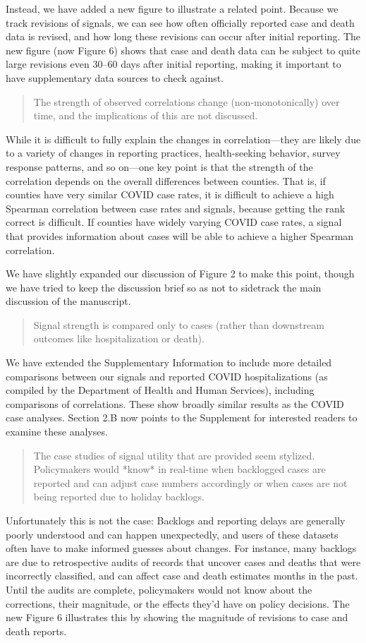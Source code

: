 \documentclass[11pt]{article}
\begin{document}
Instead, we have added a new figure to illustrate a related point. Because we
track revisions of signals, we can see how often officially reported case and
death data is revised, and how long these revisions can occur after initial
reporting. The new figure (now Figure 6) shows that case and death data can be
subject to quite large revisions even 30--60 days after initial reporting,
making it important to have supplementary data sources to check against.

\begin{quote}
  The strength of observed correlations change (non-monotonically) over time,
  and the implications of this are not discussed.
\end{quote}
While it is difficult to fully explain the changes in correlation---they are
likely due to a variety of changes in reporting practices, health-seeking
behavior, survey response patterns, and so on---one key point is that the
strength of the correlation depends on the overall differences between counties.
That is, if counties have very similar COVID case rates, it is difficult to
achieve a high Spearman correlation between case rates and signals, because
getting the rank correct is difficult. If counties have widely varying COVID
case rates, a signal that provides information about cases will be able to
achieve a higher Spearman correlation.

We have slightly expanded our discussion of Figure 2 to make this point, though
we have tried to keep the discussion brief so as not to sidetrack the main
discussion of the manuscript.

\begin{quote}
  Signal strength is compared only to cases (rather than downstream outcomes
  like hospitalization or death).
\end{quote}
We have extended the Supplementary Information to include more detailed
comparisons between our signals and reported COVID hospitalizations (as compiled
by the Department of Health and Human Services), including comparisons of
correlations. These show broadly similar results as the COVID case analyses.
Section 2.B now points to the Supplement for interested readers to examine these
analyses.

\begin{quote}
  The case studies of signal utility that are provided seem stylized.
  Policymakers would *know* in real-time when backlogged cases are reported and
  can adjust case numbers accordingly or when cases are not being reported due
  to holiday backlogs.
\end{quote}
Unfortunately this is not the case: Backlogs and reporting delays are generally
poorly understood and can happen unexpectedly, and users of these datasets often
have to make informed guesses about changes. For instance, many backlogs are due
to retrospective audits of records that uncover cases and deaths that were
incorrectly classified, and can affect case and death estimates months in the
past. Until the audits are complete, policymakers would not know about the
corrections, their magnitude, or the effects they'd have on policy decisions.
The new Figure 6 illustrates this by showing the magnitude of revisions to case
and death reports.
\end{document}
